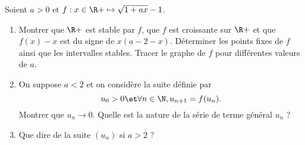 \begin{enonce}
\begin{exercise}[ID={RMS 122-2 E1326 TPE PC},subtitle={},tags={mpsi}, difficulty={0}]
Soient $a>0$ et $f:x\in\R+\mapsto \sqrt{1+ax}-1$.
\begin{enumerate}
  \item Montrer que $\R+$ est stable par $f$, que $f$ est croissante sur $\R+$ et que $f(x)-x$ est du signe de $x(a-2-x)$. Déterminer les points fixes de $f$ ainsi que les intervalles stables.
    Tracer le graphe de $f$ pour différentes valeurs de $a$.
  \item On suppose $a<2$ et on considère la suite définie par
    \begin{equation*}
      u_0>0 \et \forall n\in\N, u_{n+1}=f(u_n).
    \end{equation*}
    Montrer que $u_n\to 0$. Quelle est la nature de la série de terme général $u_n$ ?
  \item Que dire de la suite $(u_n)$ si $a>2$ ?
\end{enumerate}  
\end{exercise}
\begin{solution}
\end{solution}
\end{enonce}
